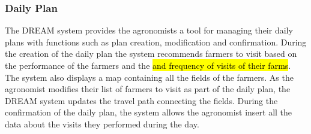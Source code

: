 \begin{flushleft}
\subsubsection{Daily Plan}
The DREAM system provides the agronomists a tool for managing their daily plans with functions such as plan creation, modification and confirmation. During the creation of the daily plan the system recommends farmers to visit based on the performance of the farmers and the \hl{and frequency of visits of their farms}. The system also displays a map containing all the fields of the farmers. As the agronomist modifies their list of farmers to visit as part of the daily plan, the DREAM system updates the travel path connecting the fields. During the confirmation of the daily plan, the system allows the agronomist insert all the data about the visits they performed during the day.
\end{flushleft}

